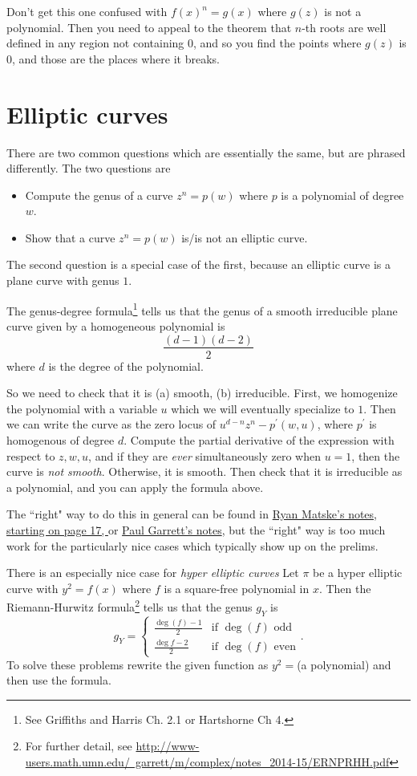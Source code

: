 \documentclass[10pt]{article}
\begin{document}
Don't get this one confused with $f(x)^n= g(x)$ where $g(z)$ is not a polynomial. Then you need to appeal to the theorem that 
$n$-th roots are well defined in any region not containing $0$, and so you find the points where $g(z)$ is $0$, and those are the places
where it breaks.

\section{Elliptic curves}

There are two common questions which are essentially the same, but are phrased differently.
The two questions are 
\begin{itemize}
	\item Compute the genus of a curve $z^n = p(w)$ where $p$ is a polynomial of degree $w$.
	\item Show that a curve $z^n = p(w)$ is/is not an elliptic curve.
\end{itemize}
The second question is a special case of the first, because an elliptic curve is a plane curve with genus $1$.

The genus-degree formula\footnote{See Griffiths and Harris Ch. 2.1 or Hartshorne Ch 4.} tells us that the genus of a smooth irreducible plane curve given by a homogeneous polynomial is
\[ \frac{(d-1)(d-2)}{2}\]
where $d$ is the degree of the polynomial. 

So we need to check that it is (a) smooth, (b) irreducible.
First, we homogenize the polynomial with a variable $u$ which we will eventually specialize to $1$. Then we can write the curve as the zero locus of
$u^{d-n} z^n - p^\prime(w,u)$, where $p^\prime$ is homogenous of degree $d$.
Compute the partial derivative of the expression with respect to $z,w,u$, and if they are \emph{ever} simultaneously zero when $u=1$, then the curve is \emph{not smooth}.
Otherwise, it is smooth.
Then check that it is irreducible as a polynomial, and you can apply the formula above.


The ``right" way to do this in general can be found in 
\href{http://www.ryanmatzke.com/pdfs/Complex\%20Analysis\%20Prelim\%20Examples.pdf}{Ryan Matske's notes, starting on page 17, } or \href{http://www-users.math.umn.edu/~garrett/m/complex/notes_2014-15/ERNPRHH.pdf}{Paul Garrett's notes}, but the ``right" way is too much work for the particularly nice 
cases which typically show up on the prelims.


There is an especially nice case for \emph{hyper elliptic curves}
Let $\pi$ be a hyper elliptic curve with $y^2 = f(x)$ where $f$ is a square-free polynomial in $x$. Then the Riemann-Hurwitz formula\footnote{For further detail, see \href{PG's notes}{http://www-users.math.umn.edu/~garrett/m/complex/notes\_2014-15/ERNPRHH.pdf}} tells us that the genus $g_Y$ is 
\[g_Y  = \begin{cases} \frac{\deg(f)-1}{2} & \text{if } \deg(f) \text{ odd} \\ \frac{\deg{f}-2}{2} & \text{if } \deg(f) \text{ even}  \end{cases}. \]
To solve these problems rewrite the given function as $y^2 = $(a polynomial) and then use the formula.
\end{document}
